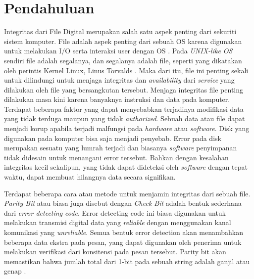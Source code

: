 \section{Pendahuluan}
\label{sec:pendahuluan}


Integritas dari File Digital merupakan salah satu aspek penting dari sekuriti sistem komputer. File adalah aspek penting dari sebuah OS karena digunakan untuk melakukan I/O serta interaksi user dengan OS \citep{stallings2008}. Pada \emph{UNIX-like OS} sendiri file adalah segalanya, dan segalanya adalah file, seperti yang dikatakan oleh perintis Kernel Linux, Linus Torvalds \cite{everythingisafile}. Maka dari itu, file ini penting sekali untuk dilindungi untuk menjaga integritas dan \emph{availability} dari \emph{service} yang dilakukan oleh file yang bersangkutan tersebut. Menjaga integritas file penting dilakukan masa kini karena banyaknya instruksi dan data pada komputer. Terdapat beberapa faktor yang dapat menyebabkan terjadinya modifikasi data yang tidak terduga maupun yang tidak \emph{authorized}. Sebuah data atau file dapat menjadi korup apabila terjadi malfungsi pada \emph{hardware} atau \emph{software}. Disk yang digunakan pada komputer bisa saja menjadi penyebab. Error pada disk merupakan sesuatu yang lumrah terjadi \citep{prabhakaran2005} dan biasanya \emph{software} penyimpanan tidak didesain untuk menangani error tersebut. Bahkan dengan kesalahan integritas kecil sekalipun, yang tidak dapat dideteksi oleh \emph{software} dengan tepat waktu, dapat membuat hilangnya data secara signifikan. 

Terdapat beberapa cara atau metode untuk menjamin integritas dari sebuah file. \emph{Parity Bit} atau biasa juga disebut dengan \emph{Check Bit} adalah bentuk sederhana dari \emph{error detecting code}. Error detecting code ini biasa digunakan untuk melakukan transmisi digital data yang \emph{reliable} dengan menggunakan kanal komunikasi yang \emph{unreliable}. Semua bentuk error detection akan menambahkan beberapa data ekstra pada pesan, yang dapat digunakan oleh penerima untuk melakukan verifikasi dari konsitensi pada pesan tersebut. Parity bit akan memastikan bahwa jumlah total dari 1-bit pada sebuah string adalah ganjil atau genap \citep{rodger2015}.

